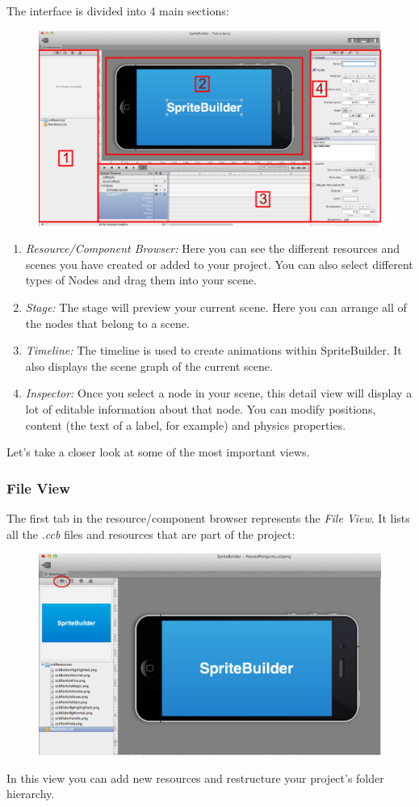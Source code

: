 The \SB{} interface is divided into 4 main sections:
\begin{figure}[H]
		\centering
		\includegraphics[width=0.9\linewidth]{images/spritebuilder/spritebuilder_ui.png}     
\end{figure} 
\begin{enumerate}
  \item \textit{Resource/Component Browser:} Here you can see the different
  resources and scenes you have created or added to your project. You can also select different types of Nodes and drag them into your scene.
  \item \textit{Stage:} The stage will preview your current scene. Here you can
  arrange all of the nodes that belong to a scene. 
  \item \textit{Timeline:} The timeline is used to create animations within
  SpriteBuilder. It also displays the scene graph of the current scene.
  \item \textit{Inspector:} Once you select a node in your scene, this detail
  view will display a lot of editable information about that node. You can modify positions, content (the text of a label, for example) and physics properties.
\end{enumerate}
Let's take a closer look at some of the most important views.

\subsubsection{File View}
The first tab in the resource/component browser represents the \textit{File
View}.
It lists all the \textit{.ccb} files and resources that are part of the \SB{}
project:
\begin{figure}[H]
		\centering
		\includegraphics[width=0.8\linewidth]{images/spritebuilder/spritebuilder_fileview.png}     
\end{figure} 
In this view you can add new resources and restructure your project's folder
hierarchy.
